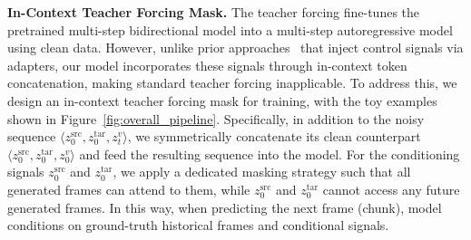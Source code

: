 \documentclass{llmxive}
\begin{document}
\noindent
\textbf{In-Context Teacher Forcing Mask.}
% 
The teacher forcing fine-tunes the pretrained multi-step bidirectional model into a multi-step autoregressive model using clean data.
% 
However, unlike prior approaches~\cite{huang2025live,zhuang2025flashvsr,shin2025motionstream} that inject control signals via adapters, our model incorporates these signals through in-context token concatenation, making standard teacher forcing inapplicable.
To address this, we design an in-context teacher forcing mask for training, with the toy examples shown in Figure~\ref{fig:overall_pipeline}.
% 
Specifically, in addition to the noisy sequence $\langle z^{\text{src}}_0, z^{\text{tar}}_0, z^{v}_t \rangle$, we symmetrically concatenate its clean counterpart $\langle z^{\text{src}}_0, z^{\text{tar}}_0, z^{v}_0 \rangle$ and feed the resulting sequence into the model.
% 
For the conditioning signals $z^{\text{src}}_0$ and $z^{\text{tar}}_0$, we apply a dedicated masking strategy such that all generated frames can attend to them, while $z^{\text{src}}_0$ and $z^{\text{tar}}_0$ cannot access any future generated frames.
% 
In this way, when predicting the next frame (chunk), model conditions on ground-truth historical frames and conditional signals.
\end{document}
